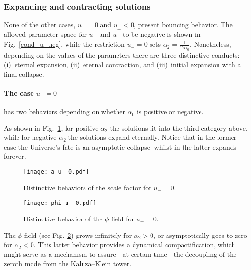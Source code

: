 \documentclass[aps,prd,12pt,superscriptaddress,showpacs,showkeys,longbibliography,reprint,nofootinbib]{revtex4-1}
\begin{document}
\subsubsection{Expanding and contracting solutions}

None of the other cases, $u_- = 0$ and $u_\pm < 0$, present bouncing behavior.
The allowed parameter space for $u_+$ and $u_-$ to be negative is shown in Fig.~\ref{cond_u_neg}, while the restriction $u_- = 0$ sets $\alpha_2 = \tfrac{1}{12 \alpha_0}$.
Nonetheless, depending on the values of the parameters there are three distinctive conducts: (i)~eternal expansion, (ii)~eternal contraction, and (iii)~initial expansion with a final collapse.

\paragraph{The case $u_- = 0$} has two behaviors depending on whether $\alpha_0$ is positive or negative.

As shown in Fig.~\ref{a_u_0}, for positive $\alpha_2$ the solutions fit into the third category above, while for negative $\alpha_2$ the solutions expand eternally. Notice that in the former case the Universe's fate is an asymptotic collapse, whilst in the latter expands forever.
\begin{figure}[H]
  \texttt{[image: a\_u-\_0.pdf]} 
  \caption{Distinctive behaviors of the scale factor for $u_- = 0$.}
  \label{a_u_0}
\end{figure}
\begin{figure}[H]
  \texttt{[image: phi\_u-\_0.pdf]}
  \caption{Distinctive behavior of the $\phi$ field for $u_- = 0$.}
  \label{phi_u_0}
\end{figure}
The $\phi$ field (see Fig.~\ref{phi_u_0}) grows infinitely for $\alpha_2 > 0$, or asymptotically goes to zero for $\alpha_2 < 0$. This latter behavior provides a {dynamical} compactification, which might serve as a mechanism to assure---at certain time---the decoupling of the zeroth mode from the Kaluza--Klein tower.
\end{document}
